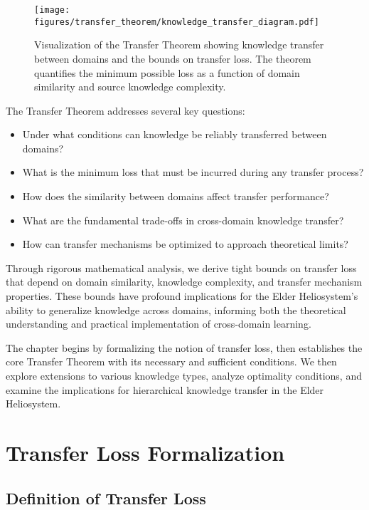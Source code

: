 \begin{figure}[ht]
    \centering
    \texttt{[image: figures/transfer\_theorem/knowledge\_transfer\_diagram.pdf]}
    \caption{Visualization of the Transfer Theorem showing knowledge transfer between domains and the bounds on transfer loss. The theorem quantifies the minimum possible loss as a function of domain similarity and source knowledge complexity.}
    \label{fig:transfer_theorem_diagram}
\end{figure}

The Transfer Theorem addresses several key questions:
\begin{itemize}
    \item Under what conditions can knowledge be reliably transferred between domains?
    \item What is the minimum loss that must be incurred during any transfer process?
    \item How does the similarity between domains affect transfer performance?
    \item What are the fundamental trade-offs in cross-domain knowledge transfer?
    \item How can transfer mechanisms be optimized to approach theoretical limits?
\end{itemize}

Through rigorous mathematical analysis, we derive tight bounds on transfer loss that depend on domain similarity, knowledge complexity, and transfer mechanism properties. These bounds have profound implications for the Elder Heliosystem's ability to generalize knowledge across domains, informing both the theoretical understanding and practical implementation of cross-domain learning.

The chapter begins by formalizing the notion of transfer loss, then establishes the core Transfer Theorem with its necessary and sufficient conditions. We then explore extensions to various knowledge types, analyze optimality conditions, and examine the implications for hierarchical knowledge transfer in the Elder Heliosystem.

\section{Transfer Loss Formalization}

\subsection{Definition of Transfer Loss}

